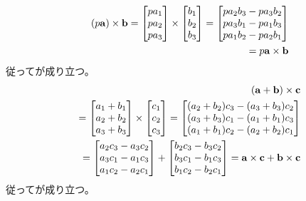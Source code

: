 \begin{eqnarray*}
&&(p{\bf a})\times{\bf b}=
\begin{bmatrix}
pa_1\\
pa_2\\
pa_3\\
\end{bmatrix}
\times
\begin{bmatrix}
b_1\\
b_2\\
b_3\\
\end{bmatrix}
=\begin{bmatrix}
pa_2b_3-pa_3b_2\\
pa_3b_1-pa_1b_3\\
pa_1b_2-pa_2b_1\\
\end{bmatrix}\\
&&=p{\bf a}\times{\bf b}
\end{eqnarray*}
従ってが成り立つ。
\begin{eqnarray*}
&&({\bf a}+{\bf b})\times{\bf c}\\
&&=
\begin{bmatrix}
a_1+b_1\\
a_2+b_2\\
a_3+b_3\\
\end{bmatrix}
\times
\begin{bmatrix}
c_1\\
c_2\\
c_3\\
\end{bmatrix}
=\begin{bmatrix}
(a_2+b_2)c_3-(a_3+b_3)c_2\\
(a_3+b_3)c_1-(a_1+b_1)c_3\\
(a_1+b_1)c_2-(a_2+b_2)c_1\\
\end{bmatrix}\\
&&=\begin{bmatrix}
a_2c_3-a_3c_2\\
a_3c_1-a_1c_3\\
a_1c_2-a_2c_1\\
\end{bmatrix}+\begin{bmatrix}
b_2c_3-b_3c_2\\
b_3c_1-b_1c_3\\
b_1c_2-b_2c_1\\
\end{bmatrix}
={\bf a}\times{\bf c}+{\bf b}\times{\bf c}
\end{eqnarray*}
従ってが成り立つ。\hv


